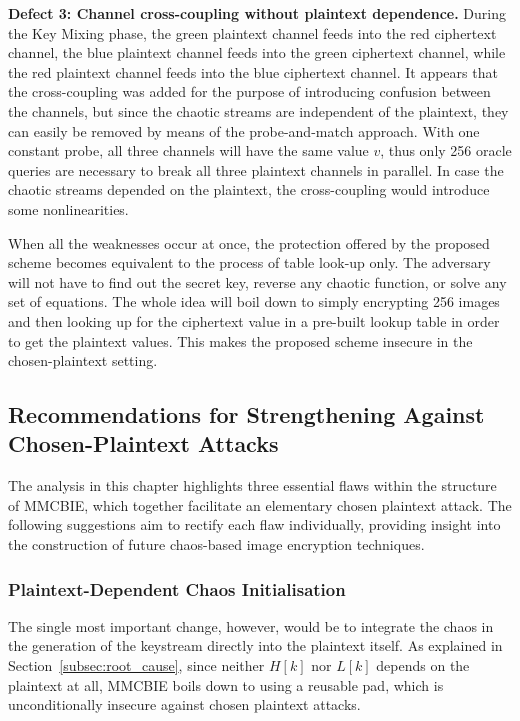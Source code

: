 \textbf{Defect 3: Channel cross-coupling without plaintext dependence.}
During the Key Mixing phase, the green plaintext channel feeds into the red ciphertext channel, the blue plaintext channel feeds into the green ciphertext channel, while the red plaintext channel feeds into the blue ciphertext channel. It appears that the cross-coupling was added for the purpose of introducing confusion between the channels, but since the chaotic streams are independent of the plaintext, they can easily be removed by means of the probe-and-match approach. With one constant probe, all three channels will have the same value $v$, thus only 256 oracle queries are necessary to break all three plaintext channels in parallel. In case the chaotic streams depended on the plaintext, the cross-coupling would introduce some nonlinearities.

When all the weaknesses occur at once, the protection offered by the proposed scheme becomes equivalent to the process of table look-up only. The adversary will not have to find out the secret key, reverse any chaotic function, or solve any set of equations. The whole idea will boil down to simply encrypting 256 images and then looking up for the ciphertext value in a pre-built lookup table in order to get the plaintext values. This makes the proposed scheme insecure in the chosen-plaintext setting.

\subsection{Recommendations for Strengthening Against Chosen-Plaintext Attacks}
\label{subsec:recommendations}

The analysis in this chapter highlights three essential flaws within the structure of MMCBIE, which together facilitate an elementary chosen plaintext attack. The following suggestions aim to rectify each flaw individually, providing insight into the construction of future chaos-based image encryption techniques.

\subsubsection{Plaintext-Dependent Chaos Initialisation}

The single most important change, however, would be to integrate the
chaos in the generation of the keystream directly into the plaintext
itself. As explained in Section~\ref{subsec:root_cause}, since neither $H[k]$
nor $L[k]$ depends on the plaintext at all, MMCBIE boils down to using a
reusable pad, which is unconditionally insecure against chosen plaintext
attacks.


